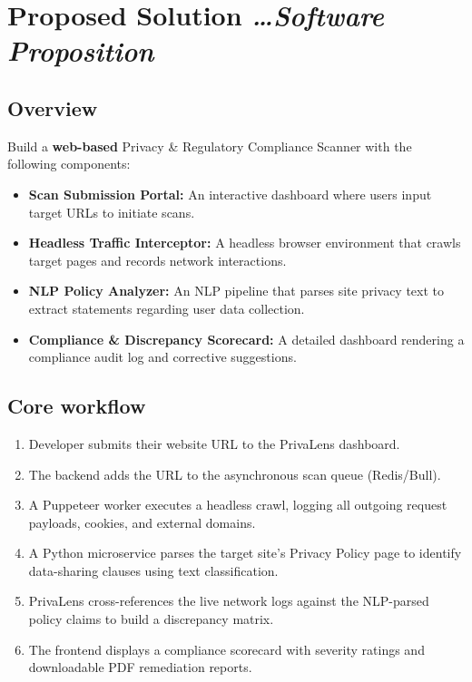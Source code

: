 \documentclass[11pt,a4paper]{article}
\newcommand{\BvrHint}[1]{{\normalfont\normalsize\itshape\hfill #1}}
\begin{document}
\section{Proposed Solution %
\BvrHint{\ldots Software Proposition}}
\subsection{Overview}
Build a \textbf{web-based} Privacy & Regulatory Compliance Scanner with the following components:
\begin{itemize}[leftmargin=0.7cm]
    \item \textbf{Scan Submission Portal:} An interactive dashboard where users input target URLs to initiate scans.
    \item \textbf{Headless Traffic Interceptor:} A headless browser environment that crawls target pages and records network interactions.
    \item \textbf{NLP Policy Analyzer:} An NLP pipeline that parses site privacy text to extract statements regarding user data collection.
    \item \textbf{Compliance & Discrepancy Scorecard:} A detailed dashboard rendering a compliance audit log and corrective suggestions.
\end{itemize}

\subsection{Core workflow}
\begin{enumerate}[leftmargin=0.7cm]
    \item Developer submits their website URL to the PrivaLens dashboard.
    \item The backend adds the URL to the asynchronous scan queue (Redis/Bull).
    \item A Puppeteer worker executes a headless crawl, logging all outgoing request payloads, cookies, and external domains.
    \item A Python microservice parses the target site's Privacy Policy page to identify data-sharing clauses using text classification.
    \item PrivaLens cross-references the live network logs against the NLP-parsed policy claims to build a discrepancy matrix.
    \item The frontend displays a compliance scorecard with severity ratings and downloadable PDF remediation reports.
\end{enumerate}
\end{document}
